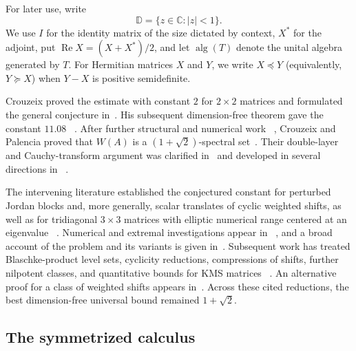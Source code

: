 \documentclass[preprints,article,submit,oneauthor]{Definitions/mdpi}
\theoremstyle{mdpi}
\theoremstyle{definition}
\newcommand{\C}{\mathbb C}
\newcommand{\D}{\mathbb D}
\newcommand{\alg}{\operatorname{alg}}
\newcommand{\RePart}{\operatorname{Re}}
\begin{document}
For later use, write
\[
  \D=\{z\in\C:\lvert z\rvert<1\}.
\]
We use $I$ for the identity matrix of the size dictated by context,
$X^*$ for the adjoint, put $\RePart X=(X+X^*)/2$, and let $\alg(T)$
denote the unital algebra generated by $T$.  For Hermitian matrices
$X$ and $Y$, we write $X\preceq Y$ (equivalently, $Y\succeq X$) when
$Y-X$ is positive semidefinite.

Crouzeix proved the estimate with constant $2$ for $2\times2$ matrices and
formulated the general conjecture in~\cite{Crouzeix2004}.  His
subsequent dimension-free theorem gave the constant $11.08$~%
\cite{Crouzeix2007}.  After further structural and numerical work~%
\cite{Crouzeix2016}, Crouzeix and Palencia proved that $W(A)$ is a
$(1+\sqrt2)$-spectral set~\cite{CrouzeixPalencia2017}.  Their
double-layer and Cauchy-transform argument was clarified in~%
\cite{RansfordSchwenninger2018} and developed in several directions in~%
\cite{CaldwellGreenbaumLi2018,CrouzeixGreenbaum2019}.

The intervening literature established the conjectured constant for
perturbed Jordan blocks and, more generally, scalar translates of
cyclic weighted shifts, as well as for tridiagonal $3\times3$ matrices
with elliptic numerical range centered at an eigenvalue~%
\cite{ChoiGreenbaum2012,Choi2013,GladerKurulaLindstrom2018}.
Numerical and extremal investigations appear in~%
\cite{GreenbaumOverton2018,Li2020}, and a broad account of the problem
and its variants is given in~\cite{BickelEtAl2020}.  Subsequent work
has treated Blaschke-product level sets, cyclicity reductions,
compressions of shifts, further nilpotent classes, and quantitative
bounds for KMS matrices~%
\cite{BickelGorkin2024,OLoughlinVirtanen2024,BickelEtAl2024,
CrouzeixGreenbaumLi2024}.  An alternative proof for a class of weighted shifts
appears in~\cite{CrouzeixGreenbaum2025}.  Across these cited
reductions, the best dimension-free universal bound remained
$1+\sqrt2$.

\subsection{The symmetrized calculus}
\end{document}

